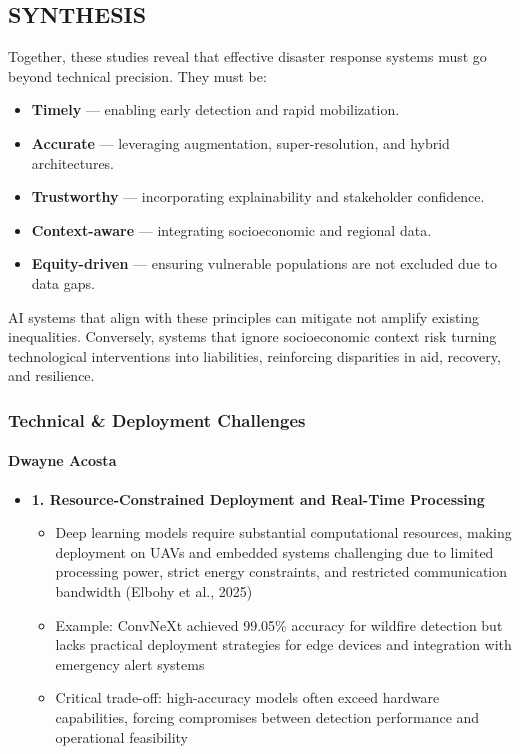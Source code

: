 \documentclass{beamer}
\newcommand{\namedframe}[3]{
  \begin{frame}
    \frametitle{#2}
    \framesubtitle{#1}
    #3
  \end{frame}
}
\begin{document}
{\subsection{SYNTHESIS}
Together, these studies reveal that effective disaster response systems must go beyond technical precision. They must be:
\begin{itemize}
    \item \textbf{Timely} — enabling early detection and rapid mobilization.
    \item \textbf{Accurate} — leveraging augmentation, super-resolution, and hybrid architectures.
    \item \textbf{Trustworthy} — incorporating explainability and stakeholder confidence.
    \item \textbf{Context-aware} — integrating socioeconomic and regional data.
    \item \textbf{Equity-driven} — ensuring vulnerable populations are not excluded due to data gaps.
\end{itemize}
AI systems that align with these principles can mitigate not amplify existing inequalities. Conversely, systems that ignore socioeconomic context risk turning technological interventions into liabilities, reinforcing disparities in aid, recovery, and resilience.
}

\namedframe{Dwayne Acosta}{Technical \& Deployment Challenges}{
\begin{itemize}
    \item \textbf{1. Resource-Constrained Deployment and Real-Time Processing}
    \begin{itemize}
        \item Deep learning models require substantial computational resources, making deployment on UAVs and embedded systems challenging due to limited processing power, strict energy constraints, and restricted communication bandwidth (Elbohy et al., 2025)
        \item Example: ConvNeXt achieved 99.05\% accuracy for wildfire detection but lacks practical deployment strategies for edge devices and integration with emergency alert systems
        \item Critical trade-off: high-accuracy models often exceed hardware capabilities, forcing compromises between detection performance and operational feasibility
    \end{itemize}
\end{itemize}
}
\end{document}
